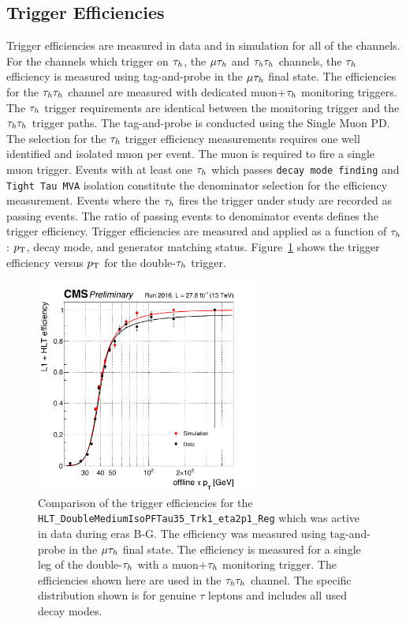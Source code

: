 \subsection{Trigger Efficiencies}
\label{sec:htt_trigger_eff}
Trigger efficiencies are measured in data and in simulation for all of the channels. For the channels
which trigger on $\tau_{h}$, the $\mu\tau_{h}$ and $\tau_{h}\tau_{h}$ channels, the $\tau_{h}$ efficiency is measured
using tag-and-probe in the $\mu\tau_{h}$ final state. The efficiencies for the $\tau_{h}\tau_{h}$ channel
are measured with dedicated muon+$\tau_{h}$ monitoring triggers. The $\tau_{h}$ trigger requirements
are identical between the monitoring trigger and the $\tau_{h}\tau_{h}$ trigger paths. The tag-and-probe
is conducted using the Single Muon PD. The selection for the $\tau_{h}$ trigger efficiency measurements 
requires one well identified and isolated muon per event. The muon is required to fire a single muon trigger.
Events with at least one $\tau_{h}$ which passes \texttt{decay mode finding} and \texttt{Tight Tau MVA} isolation
constitute the denominator selection for the efficiency measurement. Events where the $\tau_{h}$
fires the trigger under study are recorded as passing events. The ratio of passing events to
denominator events defines the trigger efficiency. Trigger efficiencies are measured and applied as 
a function of $\tau_{h}$: $p_\mathrm{T}$, decay mode, and generator matching status. Figure~\ref{fig:htt_tt_trig}
shows the trigger efficiency versus $p_\mathrm{T}$ for the double-$\tau_{h}$ trigger.

\begin{figure}[!htbp]
\centering
     \includegraphics[width=0.65\textwidth]{higgs_to_taus/plots/htt_tautau_trigger_efficiency.pdf}
     \caption{
Comparison of the trigger efficiencies for the \texttt{HLT\_DoubleMediumIsoPFTau35\_Trk1\_eta2p1\_Reg}
which was active in data during eras B-G. The efficiency was measured using tag-and-probe in the
$\mu\tau_{h}$ final state. The efficiency is measured for a single leg of the double-$\tau_{h}$
with a muon+$\tau_{h}$ monitoring trigger. The efficiencies shown here are used in the $\tau_{h}\tau_{h}$ channel.
The specific distribution shown is for genuine $\tau$ leptons and includes all used decay modes.
}
     \label{fig:htt_tt_trig}
\end{figure}

